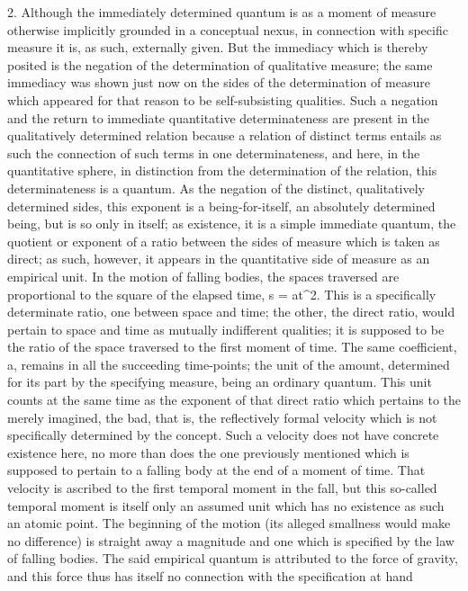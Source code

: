 2. Although the immediately determined quantum is as
a moment of measure otherwise implicitly grounded in a conceptual nexus,
in connection with specific measure it is, as such, externally given.
But the immediacy which is thereby posited is
the negation of the determination of qualitative measure;
the same immediacy was shown just now
on the sides of the determination of measure
which appeared for that reason to be self-subsisting qualities.
Such a negation and the return to immediate
quantitative determinateness are present
in the qualitatively determined relation
because a relation of distinct terms
entails as such the connection of such terms
in one determinateness,
and here, in the quantitative sphere,
in distinction from the determination of the relation,
this determinateness is a quantum.
As the negation of the distinct, qualitatively determined sides,
this exponent is a being-for-itself,
an absolutely determined being,
but is so only in itself;
as existence, it is a simple immediate quantum,
the quotient or exponent of a ratio between the sides of measure
which is taken as direct;
as such, however, it appears in the quantitative side
of measure as an empirical unit.
In the motion of falling bodies,
the spaces traversed are proportional
to the square of the elapsed time, s = at^2.
This is a specifically determinate ratio,
one between space and time;
the other, the direct ratio, would pertain to space and time
as mutually indifferent qualities;
it is supposed to be the ratio of the space traversed
to the first moment of time.
The same coefficient, a, remains in all the succeeding time-points;
the unit of the amount, determined for its part by the specifying measure,
being an ordinary quantum.
This unit counts at the same time as
the exponent of that direct ratio
which pertains to the merely imagined, the bad,
that is, the reflectively formal velocity
which is not specifically determined by the concept.
Such a velocity does not have concrete existence here,
no more than does the one previously mentioned
which is supposed to pertain to a falling body
at the end of a moment of time.
That velocity is ascribed to
the first temporal moment in the fall,
but this so-called temporal moment is itself
only an assumed unit which has no existence
as such an atomic point.
The beginning of the motion
(its alleged smallness would make no difference)
is straight away a magnitude
and one which is specified by the law of falling bodies.
The said empirical quantum is attributed to the force of gravity,
and this force thus has itself no connection with the
specification at hand
